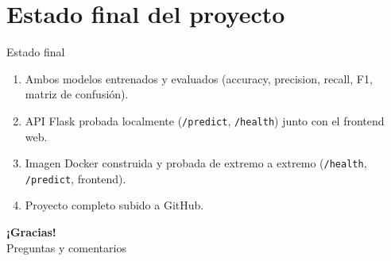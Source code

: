 \documentclass[aspectratio=169]{beamer}
\begin{document}
\section{Estado final del proyecto}

\begin{frame}{Estado final}
  \begin{enumerate}
    \item Ambos modelos entrenados y evaluados (accuracy, precision, recall, F1, matriz de confusión).
    \item API Flask probada localmente (\texttt{/predict}, \texttt{/health}) junto con el frontend web.
    \item Imagen Docker construida y probada de extremo a extremo (\texttt{/health}, \texttt{/predict}, frontend).
    \item Proyecto completo subido a GitHub.
  \end{enumerate}
\end{frame}

\begin{frame}
  \centering
  \Large \textbf{¡Gracias!}\\[0.5cm]
  \normalsize Preguntas y comentarios
\end{frame}
\end{document}
